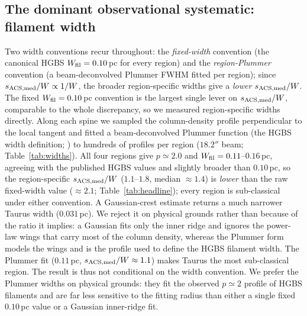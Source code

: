 \documentclass[usenatbib,twoside,twocolumn]{mnras}
\begin{document}
\subsection{The dominant observational systematic: filament width}
\label{sec:widths}

Two width conventions recur throughout: the \emph{fixed-width} convention (the canonical HGBS $W_{\rm fil}=0.10$\,pc for every region) and the \emph{region-Plummer} convention (a beam-deconvolved Plummer FWHM fitted per region); since $s_{\rm ACS,med}/W\propto1/W$, the broader region-specific widths give a \emph{lower} $s_{\rm ACS,med}/W$. The fixed $W_{\rm fil}=0.10$\,pc convention is the largest single lever on $s_{\rm ACS,med}/W$, comparable to the whole discrepancy, so we measured region-specific widths directly. Along each spine we sampled the column-density profile perpendicular to the local tangent and fitted a beam-deconvolved Plummer function (the HGBS width definition; \citealt{Arzoumanian2019}) to hundreds of profiles per region ($18.2''$ beam; Table~\ref{tab:widths}). All four regions give $p\simeq2.0$ and $W_{\rm fil}=0.11$--$0.16$\,pc, agreeing with the published HGBS values and slightly broader than $0.10$\,pc, so the region-specific $s_{\rm ACS,med}/W$ ($1.1$--$1.8$, median $\approx1.4$) is \emph{lower} than the raw fixed-width value ($\approx2.1$; Table~\ref{tab:headline}); every region is sub-classical under either convention. A Gaussian-crest estimate returns a much narrower Taurus width ($0.031$\,pc). We reject it on physical grounds rather than because of the ratio it implies: a Gaussian fits only the inner ridge and ignores the power-law wings that carry most of the column density, whereas the Plummer form models the wings and is the profile used to define the HGBS filament width. The Plummer fit ($0.11$\,pc, $s_{\rm ACS,med}/W\approx1.1$) makes Taurus the most sub-classical region. The result is thus not conditional on the width convention. We prefer the Plummer widths on physical grounds: they fit the observed $p\simeq2$ profile of HGBS filaments and are far less sensitive to the fitting radius than either a single fixed $0.10$\,pc value or a Gaussian inner-ridge fit.
\end{document}
